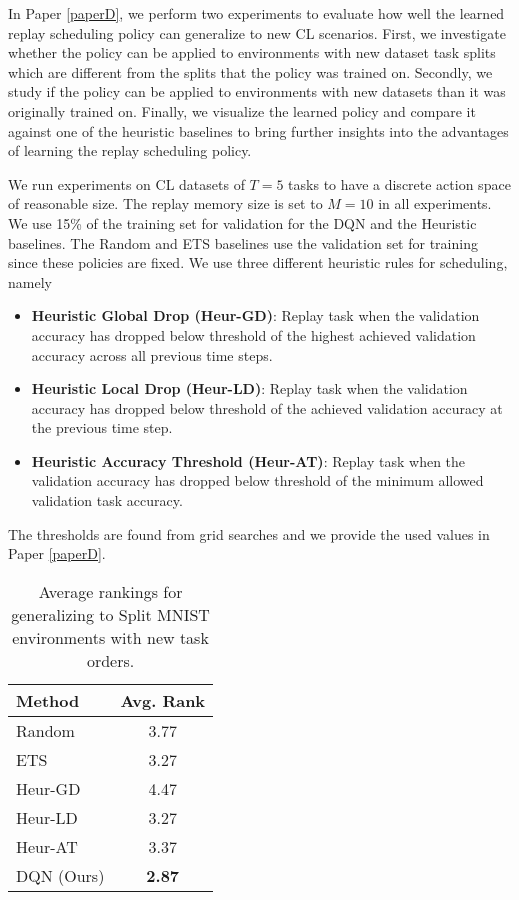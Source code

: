 In Paper \ref{paperD}, we perform two experiments to evaluate how well the learned replay scheduling policy can generalize to new CL scenarios. First, we investigate whether the policy can be applied to environments with new dataset task splits which are different from the splits that the policy was trained on. Secondly, we study if the policy can be applied to environments with new datasets than it was originally trained on. Finally, we visualize the learned policy and compare it against one of the heuristic baselines to bring further insights into the advantages of learning the replay scheduling policy.

We run experiments on CL datasets of $T=5$ tasks to have a discrete action space of reasonable size. The replay memory size is set to $M=10$ in all experiments. We use 15\% of the training set for validation for the DQN and the Heuristic baselines. The Random and ETS baselines use the validation set for training since these policies are fixed.  
We use three different heuristic rules for scheduling, namely
\begin{itemize}[itemsep=0em,topsep=1pt]
	\item \textbf{Heuristic Global Drop (Heur-GD)}: Replay task when the validation accuracy has dropped below threshold of the highest achieved validation accuracy across all previous time steps.
	
	\item \textbf{Heuristic Local Drop (Heur-LD)}: Replay task when the validation accuracy has dropped below threshold of the achieved validation accuracy at the previous time step.
	
	\item \textbf{Heuristic Accuracy Threshold (Heur-AT)}: Replay task when the validation accuracy has dropped below threshold of the minimum allowed validation task accuracy. 
\end{itemize}
The thresholds are found from grid searches and we provide the used values in Paper \ref{paperD}. 

\vspace{-2mm}
\begin{wraptable}{r}{0.35\textwidth}
	\footnotesize
	\vspace{-5mm}
	\captionsetup{width=.84\linewidth}
	\caption{Average rankings for generalizing to Split MNIST environments with new task orders. 
	}
	\label{tab:avg_ranking_split_mnist_new_task_orders}
	\vspace{-7mm}
	\begin{tabular}{l c} \\
		\toprule  
		{\bf Method} & {\bf Avg. Rank} \\ 
		\midrule
		Random 		& 3.77 \\
		ETS 		& 3.27 \\
		Heur-GD 	& 4.47 \\
		Heur-LD 	& 3.27 \\
		Heur-AT 	& 3.37 \\
		\midrule
		DQN (Ours)		& {\bf 2.87} \\
		\bottomrule
	\end{tabular}
\end{wraptable} 
